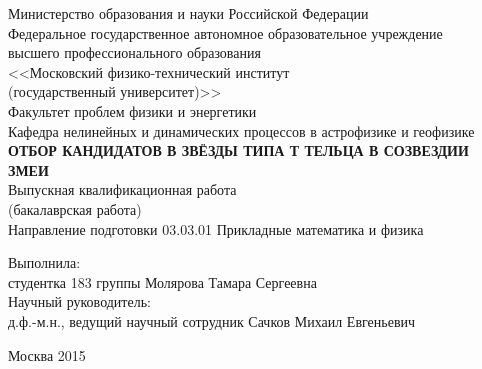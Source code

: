 \begin{titlepage}
\newpage
\begin{center}
Министерство образования и науки Российской Федерации\\
\vspace{1em} 
Федеральное государственное автономное образовательное учреждение\\
высшего профессионального образования\\
<<Московский физико-технический институт\\
(государственный университет)>>\\
\vspace{1em}
Факультет проблем физики и энергетики\\
\vspace{1em}
Кафедра нелинейных и динамических процессов в астрофизике и геофизике\\
\vspace{5em}
\textbf{\large\MakeTextUppercase{Отбор кандидатов в звёзды типа Т Тельца в созвездии Змеи}}\\
\vspace{1em}
Выпускная квалификационная работа\\
(бакалаврская работа)\\
\vspace{1em}
Направление подготовки 03.03.01 Прикладные математика и физика\\
\end{center}
\begin{flushleft}
\vspace{3em}
Выполнила:\\
студентка 183 группы \hrulefill Молярова Тамара Сергеевна\\
\vspace{3em}
Научный руководитель:\\
д.ф.-м.н., ведущий научный сотрудник \hrulefill Сачков Михаил Евгеньевич\\
\vspace{\fill}
\end{flushleft}
\begin{center}
Москва 2015
\end{center}
\end{titlepage}